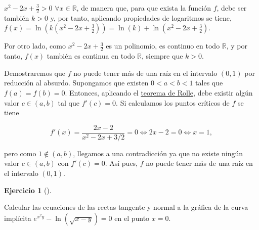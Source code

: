 \documentclass[
  a4paper,
]{scrreport}
\theoremstyle{definition}
\newtheorem{exercise}{Ejercicio}[chapter]
\theoremstyle{remark}
\begin{document}
\begin{tcolorbox}[enhanced jigsaw, colframe=quarto-callout-tip-color-frame, opacitybacktitle=0.6, colbacktitle=quarto-callout-tip-color!10!white, rightrule=.15mm, toptitle=1mm, opacityback=0, title=\textcolor{quarto-callout-tip-color}{\faLightbulb}\hspace{0.5em}{Solución}, arc=.35mm, toprule=.15mm, breakable, bottomtitle=1mm, titlerule=0mm, bottomrule=.15mm, leftrule=.75mm, coltitle=black, left=2mm, colback=white]

\(x^2-2x+\frac{3}{2}>0\) \(\forall x\in\mathbb{R}\), de manera que, para
que exista la función \(f\), debe ser también \(k>0\) y, por tanto,
aplicando propiedades de logaritmos se tiene,
\(f(x)=\ln\left(k\left(x^2-2x+\frac{3}{2}\right)\right)= \ln(k)+\ln\left(x^2-2x+\frac{3}{2}\right)\).

Por otro lado, como \(x^2-2x+\frac{3}{2}\) es un polinomio, es continuo
en todo \(\mathbb{R}\), y por tanto, \(f(x)\) también es continua en
todo \(\mathbb{R}\), siempre que \(k>0\).

Demostraremos que \(f\) no puede tener más de una raíz en el intervalo
\((0,1)\) por reducción al absurdo. Supongamos que existen
\(0 < a < b < 1\) tales que \(f(a)=f(b)=0\). Entonces, aplicando el
\href{https://aprendeconalf.es/analisis-manual/derivadas.html\#thm-rolle}{teorema
de Rolle}, debe existir algún valor \(c\in(a,b)\) tal que \(f'(c)=0\).
Si calculamos los puntos críticos de \(f\) se tiene

\[
f'(x) = \frac{2x-2}{x^2-2x+3/2} = 0 \Leftrightarrow 2x-2=0 \Leftrightarrow x=1,
\]

pero como \(1\not \in (a,b)\), llegamos a una contradicción ya que no
existe ningún valor \(c\in(a,b)\) con \(f'(c)=0\). Así pues, \(f\) no
puede tener más de una raíz en el intervalo \((0,1)\).

\end{tcolorbox}

\leavevmode{}%
\begin{exercise}[]\label{exr-10}

Calcular las ecuaciones de las rectas tangente y normal a la gráfica de
la curva implícita \(e^{x^2y}-\ln(\sqrt{x-y})= 0\) en el punto \(x=0\).

\end{exercise}
\end{document}

